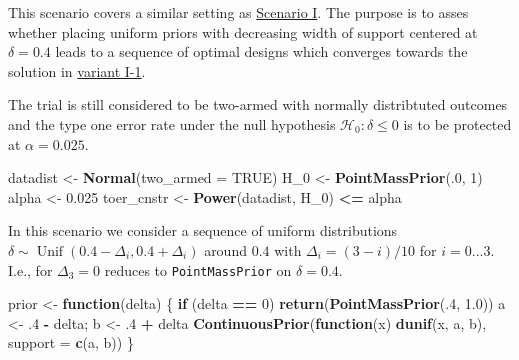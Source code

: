 \documentclass[]{book}
\newenvironment{Shaded}{\begin{snugshade}}{\end{snugshade}}
\newcommand{\ControlFlowTok}[1]{\textcolor[rgb]{0.13,0.29,0.53}{\textbf{#1}}}
\newcommand{\DataTypeTok}[1]{\textcolor[rgb]{0.13,0.29,0.53}{#1}}
\newcommand{\DecValTok}[1]{\textcolor[rgb]{0.00,0.00,0.81}{#1}}
\newcommand{\FloatTok}[1]{\textcolor[rgb]{0.00,0.00,0.81}{#1}}
\newcommand{\KeywordTok}[1]{\textcolor[rgb]{0.13,0.29,0.53}{\textbf{#1}}}
\newcommand{\NormalTok}[1]{#1}
\newcommand{\OperatorTok}[1]{\textcolor[rgb]{0.81,0.36,0.00}{\textbf{#1}}}
\newcommand{\OtherTok}[1]{\textcolor[rgb]{0.56,0.35,0.01}{#1}}
\newcommand{\StringTok}[1]{\textcolor[rgb]{0.31,0.60,0.02}{#1}}
\begin{document}
This scenario covers a similar setting as \protect\hyperlink{scenarioI}{Scenario I}.
The purpose is to asses whether placing uniform priors with decreasing
width of support centered at \(\delta=0.4\) leads to a sequence of
optimal designs which converges towards the solution in \protect\hyperlink{variantI.1}{variant I-1}.

The trial is still considered to be two-armed with normally distribtuted outcomes
and the type one error rate under the null hypothesis
\(\mathcal{H}_0:\delta \leq 0\) is to be protected at \(\alpha = 0.025\).

\begin{Shaded}
\begin{Highlighting}[]
\NormalTok{datadist   <-}\StringTok{ }\KeywordTok{Normal}\NormalTok{(}\DataTypeTok{two_armed =} \OtherTok{TRUE}\NormalTok{)}
\NormalTok{H_}\DecValTok{0}\NormalTok{        <-}\StringTok{ }\KeywordTok{PointMassPrior}\NormalTok{(.}\DecValTok{0}\NormalTok{, }\DecValTok{1}\NormalTok{)}
\NormalTok{alpha      <-}\StringTok{ }\FloatTok{0.025}
\NormalTok{toer_cnstr <-}\StringTok{ }\KeywordTok{Power}\NormalTok{(datadist, H_}\DecValTok{0}\NormalTok{) }\OperatorTok{<=}\StringTok{ }\NormalTok{alpha}
\end{Highlighting}
\end{Shaded}

In this scenario we consider a sequence of uniform distributions
\(\delta\sim\operatorname{Unif}(0.4 - \Delta_i, 0.4 + \Delta_i)\)
around \(0.4\) with \(\Delta_i=(3 - i)/10\) for \(i=0\ldots 3\).
I.e., for \(\Delta_3=0\) reduces to \texttt{PointMassPrior} on \(\delta=0.4\).

\begin{Shaded}
\begin{Highlighting}[]
\NormalTok{prior <-}\StringTok{ }\ControlFlowTok{function}\NormalTok{(delta) \{}
    \ControlFlowTok{if}\NormalTok{ (delta }\OperatorTok{==}\StringTok{ }\DecValTok{0}\NormalTok{)}
        \KeywordTok{return}\NormalTok{(}\KeywordTok{PointMassPrior}\NormalTok{(.}\DecValTok{4}\NormalTok{, }\FloatTok{1.0}\NormalTok{))}
\NormalTok{    a <-}\StringTok{ }\FloatTok{.4} \OperatorTok{-}\StringTok{ }\NormalTok{delta; b <-}\StringTok{ }\FloatTok{.4} \OperatorTok{+}\StringTok{ }\NormalTok{delta}
    \KeywordTok{ContinuousPrior}\NormalTok{(}\ControlFlowTok{function}\NormalTok{(x) }\KeywordTok{dunif}\NormalTok{(x, a, b), }\DataTypeTok{support =} \KeywordTok{c}\NormalTok{(a, b))}
\NormalTok{\}}
\end{Highlighting}
\end{Shaded}
\end{document}
